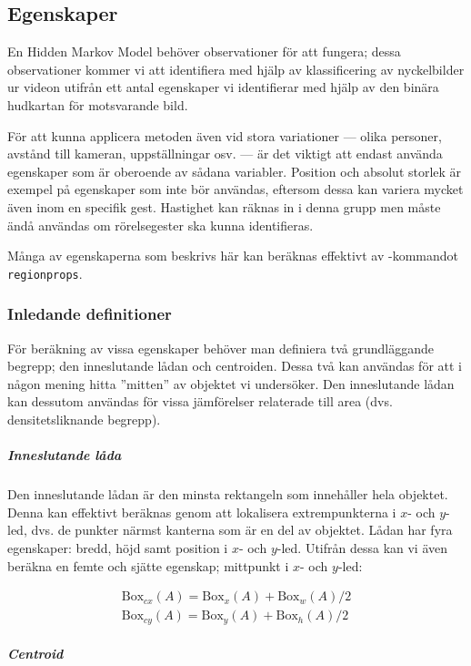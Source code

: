 \documentclass[../rapport_MVEX01-11-05]{subfiles}
\begin{document}
\subsection{Egenskaper}
En Hidden Markov Model behöver observationer för att fungera; dessa
observationer kommer vi att identifiera med hjälp av klassificering av
nyckelbilder ur videon utifrån ett antal egenskaper vi identifierar
med hjälp av den binära hudkartan för motsvarande bild.

För att kunna applicera metoden även vid stora variationer --- olika
personer, avstånd till kameran, uppställningar osv. --- är det viktigt
att endast använda egenskaper som är oberoende av sådana variabler.
Position och absolut storlek är exempel på egenskaper som inte bör
användas, eftersom dessa kan variera mycket även inom en specifik
gest. Hastighet kan räknas in i denna grupp men måste ändå användas
om rörelsegester ska kunna identifieras.

Många av egenskaperna som beskrivs här kan beräknas effektivt av
\MATLAB-kommandot \texttt{regionprops}.

\subsubsection{Inledande definitioner}

För beräkning av vissa egenskaper behöver man definiera två
grundläggande begrepp; den inneslutande lådan och centroiden. Dessa
två kan användas för att i någon mening hitta ''mitten'' av objektet
vi undersöker. Den inneslutande lådan kan dessutom användas för vissa
jämförelser relaterade till area (dvs. densitetsliknande begrepp).

\subparagraph{Inneslutande låda}

Den inneslutande lådan är den minsta rektangeln som innehåller hela
objektet. Denna kan effektivt beräknas genom att lokalisera
extrempunkterna i $x$- och $y$-led, dvs. de punkter närmst kanterna
som är en del av objektet. Lådan har fyra egenskaper: bredd, höjd samt
position i $x$- och $y$-led. Utifrån dessa kan vi även beräkna en femte
och sjätte egenskap; mittpunkt i $x$- och $y$-led:

\begin{gather*}
  \textrm{Box}_{cx}(A) = \textrm{Box}_x(A) + \textrm{Box}_w(A)/2\\
  \textrm{Box}_{cy}(A) = \textrm{Box}_y(A) + \textrm{Box}_h(A)/2
\end{gather*}

\subparagraph{Centroid}
\end{document}
